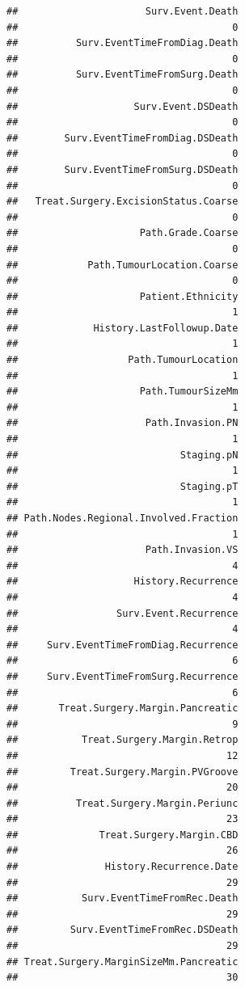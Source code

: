 \documentclass{article}
\begin{document}
\begin{knitrout}
\begin{kframe}
\begin{verbatim}
##                      Surv.Event.Death 
##                                     0 
##          Surv.EventTimeFromDiag.Death 
##                                     0 
##          Surv.EventTimeFromSurg.Death 
##                                     0 
##                    Surv.Event.DSDeath 
##                                     0 
##        Surv.EventTimeFromDiag.DSDeath 
##                                     0 
##        Surv.EventTimeFromSurg.DSDeath 
##                                     0 
##   Treat.Surgery.ExcisionStatus.Coarse 
##                                     0 
##                     Path.Grade.Coarse 
##                                     0 
##            Path.TumourLocation.Coarse 
##                                     0 
##                     Patient.Ethnicity 
##                                     1 
##             History.LastFollowup.Date 
##                                     1 
##                   Path.TumourLocation 
##                                     1 
##                     Path.TumourSizeMm 
##                                     1 
##                      Path.Invasion.PN 
##                                     1 
##                            Staging.pN 
##                                     1 
##                            Staging.pT 
##                                     1 
## Path.Nodes.Regional.Involved.Fraction 
##                                     1 
##                      Path.Invasion.VS 
##                                     4 
##                    History.Recurrence 
##                                     4 
##                 Surv.Event.Recurrence 
##                                     4 
##     Surv.EventTimeFromDiag.Recurrence 
##                                     6 
##     Surv.EventTimeFromSurg.Recurrence 
##                                     6 
##       Treat.Surgery.Margin.Pancreatic 
##                                     9 
##           Treat.Surgery.Margin.Retrop 
##                                    12 
##         Treat.Surgery.Margin.PVGroove 
##                                    20 
##          Treat.Surgery.Margin.Periunc 
##                                    23 
##              Treat.Surgery.Margin.CBD 
##                                    26 
##               History.Recurrence.Date 
##                                    29 
##           Surv.EventTimeFromRec.Death 
##                                    29 
##         Surv.EventTimeFromRec.DSDeath 
##                                    29 
## Treat.Surgery.MarginSizeMm.Pancreatic 
##                                    30 

\end{verbatim}
\end{kframe}
\end{knitrout}
\end{document}
